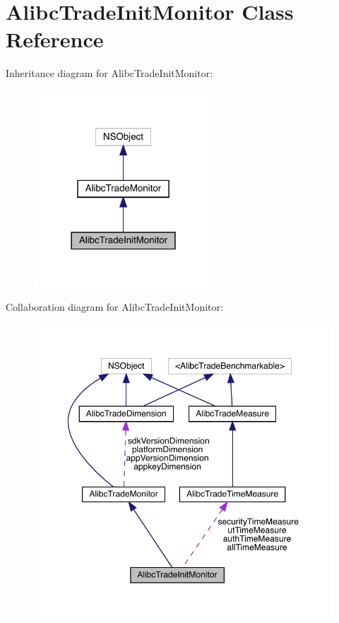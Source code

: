 \hypertarget{interface_alibc_trade_init_monitor}{}\section{Alibc\+Trade\+Init\+Monitor Class Reference}
\label{interface_alibc_trade_init_monitor}


Inheritance diagram for Alibc\+Trade\+Init\+Monitor\+:\nopagebreak
\begin{figure}[H]
\begin{center}
\leavevmode
\includegraphics[width=190pt]{interface_alibc_trade_init_monitor__inherit__graph}
\end{center}
\end{figure}


Collaboration diagram for Alibc\+Trade\+Init\+Monitor\+:\nopagebreak
\begin{figure}[H]
\begin{center}
\leavevmode
\includegraphics[width=350pt]{interface_alibc_trade_init_monitor__coll__graph}
\end{center}
\end{figure}
